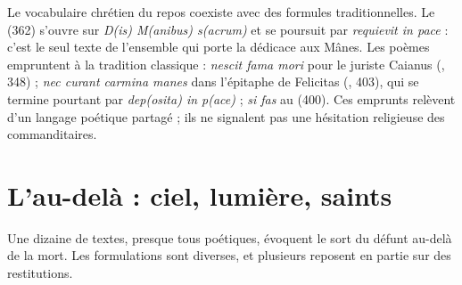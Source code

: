 Le vocabulaire chrétien du repos coexiste avec des formules traditionnelles. Le  (362) s’ouvre sur \emph{D(is) M(anibus) s(acrum)} et se poursuit par \emph{requievit in pace} : c’est le seul texte de l’ensemble qui porte la dédicace aux Mânes. Les poèmes empruntent à la tradition classique : \emph{nescit fama mori} pour le juriste Caianus (, 348) ; \emph{nec curant carmina manes} dans l’épitaphe de Felicitas (, 403), qui se termine pourtant par \emph{dep(osita) in p(ace)} ; \emph{si fas} au  (400). Ces emprunts relèvent d’un langage poétique partagé ; ils ne signalent pas une hésitation religieuse des commanditaires.

\section{L’au-delà : ciel, lumière, saints}

Une dizaine de textes, presque tous poétiques, évoquent le sort du défunt au-delà de la mort. Les formulations sont diverses, et plusieurs reposent en partie sur des restitutions.


